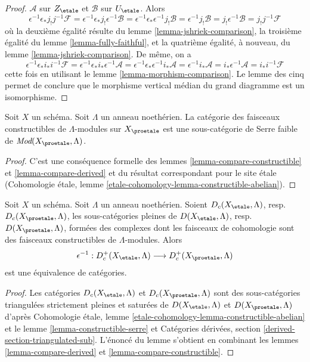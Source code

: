 \begin{proof}
$\mathcal{A}$ sur $Z_\etale$ et $\mathcal{B}$ sur $U_\etale$.
Alors
$$
\epsilon^{-1}\epsilon_*j_!j^{-1}\mathcal{F} =
\epsilon^{-1}\epsilon_*j_!\epsilon^{-1}\mathcal{B} =
\epsilon^{-1}\epsilon_*\epsilon^{-1}j_!\mathcal{B} =
\epsilon^{-1}j_!\mathcal{B} =
j_!\epsilon^{-1}\mathcal{B} =
j_!j^{-1}\mathcal{F}
$$
où la deuxième égalité résulte du lemme \ref{lemma-jshriek-comparison},
la troisième égalité du lemme \ref{lemma-fully-faithful}, et la
quatrième égalité, à nouveau, du lemme \ref{lemma-jshriek-comparison}.
De même, on a
$$
\epsilon^{-1}\epsilon_*i_*i^{-1}\mathcal{F} =
\epsilon^{-1}\epsilon_*i_*\epsilon^{-1}\mathcal{A} =
\epsilon^{-1}\epsilon_*\epsilon^{-1}i_*\mathcal{A} =
\epsilon^{-1}i_*\mathcal{A} =
i_*\epsilon^{-1}\mathcal{A} =
i_*i^{-1}\mathcal{F}
$$
cette fois en utilisant le lemme \ref{lemma-morphism-comparison}.
Le lemme des cinq permet de conclure que le
morphisme vertical médian du grand diagramme est un isomorphisme.
\end{proof}

\begin{lemma}
\label{lemma-constructible-serre}
Soit $X$ un schéma. Soit $\Lambda$ un anneau noethérien.
La catégorie des faisceaux constructibles de $\Lambda$-modules sur $X_\proetale$
est une sous-catégorie de Serre faible de $\textit{Mod}(X_\proetale, \Lambda)$.
\end{lemma}

\begin{proof}
C'est une conséquence formelle des
lemmes \ref{lemma-compare-constructible} et \ref{lemma-compare-derived}
et du résultat correspondant pour le site \'etale
(Cohomologie \'etale, lemme \ref{etale-cohomology-lemma-constructible-abelian}).
\end{proof}

\begin{lemma}
\label{lemma-compare-constructible-derived}
Soit $X$ un schéma. Soit $\Lambda$ un anneau noethérien.
Soient $D_c(X_\etale, \Lambda)$, resp.\ $D_c(X_\proetale, \Lambda)$,
les sous-catégories pleines de
$D(X_\etale, \Lambda)$, resp.\ $D(X_\proetale, \Lambda)$,
formées des complexes dont les faisceaux de cohomologie sont des
faisceaux constructibles de $\Lambda$-modules. Alors
$$
\epsilon^{-1} :
D_c^+(X_\etale, \Lambda)
\longrightarrow
D_c^+(X_\proetale, \Lambda)
$$
est une équivalence de catégories.
\end{lemma}

\begin{proof}
Les catégories $D_c(X_\etale, \Lambda)$ et $D_c(X_\proetale, \Lambda)$
sont des sous-catégories triangulées strictement pleines et saturées de
$D(X_\etale, \Lambda)$ et $D(X_\proetale, \Lambda)$ d'après
Cohomologie \'etale, lemme \ref{etale-cohomology-lemma-constructible-abelian}
et
le lemme \ref{lemma-constructible-serre}
et
Catégories dérivées, section \ref{derived-section-triangulated-sub}.
L'énoncé du lemme s'obtient en combinant les
lemmes \ref{lemma-compare-derived} et
\ref{lemma-compare-constructible}.
\end{proof}


